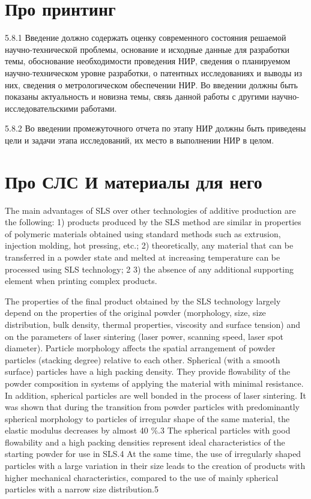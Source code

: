 	\section{Про принтинг}
	5.8.1 Введение должно содержать оценку современного состояния решаемой научно-технической проблемы, основание и исходные данные для разработки темы, обоснование необходимости проведения НИР, сведения о планируемом научно-техническом уровне разработки, о патентных исследованиях и выводы из них, сведения о метрологическом обеспечении НИР. Во введении должны быть показаны актуальность и новизна темы, связь данной работы с другими научно-исследовательскими работами.

5.8.2 Во введении промежуточного отчета по этапу НИР должны быть приведены цели и задачи этапа исследований, их место в выполнении НИР в целом.
	




\section{Про СЛС И материалы для него}
The main advantages of SLS over other technologies of additive production are the following: 1) products produced by the SLS method are similar in properties of polymeric materials obtained using standard methods such as extrusion, injection molding, hot pressing, etc.; 2) theoretically, any material that can be transferred in a powder state and melted at increasing temperature can be processed using SLS technology; 2 3) the absence of any additional supporting element when printing complex products.

The properties of the final product obtained by the SLS technology largely depend on the properties of the original powder (morphology, size, size distribution, bulk density, thermal properties, viscosity and surface tension) and on the parameters of laser sintering (laser power, scanning speed, laser spot diameter). Particle morphology affects the spatial arrangement of powder particles (stacking degree) relative to each other. Spherical (with a smooth surface) particles have a high packing density. They provide flowability of the powder composition in systems of applying the material with minimal resistance. In addition, spherical particles are well bonded in the process of laser sintering. It was shown that during the transition from powder particles with predominantly spherical morphology to particles of irregular shape of the same material, the elastic modulus decreases by almost 40 \%.3 The spherical particles with good flowability and a high packing densities represent ideal characteristics of the starting powder for use in SLS.4 At the same time, the use of irregularly shaped particles with a large variation in their size leads to the creation of products with higher mechanical characteristics, compared to the use of mainly spherical particles with a narrow size distribution.5
	
